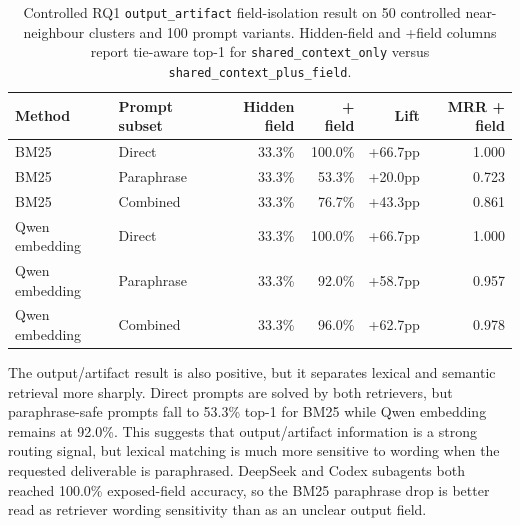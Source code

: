 \begin{table}[H]
\centering
\scriptsize
\setlength{\tabcolsep}{2pt}
\begin{tabular}{p{}p{}rrrr}
\toprule
Method & Prompt subset & Hidden field & + field & Lift & MRR + field \\
\midrule
BM25 & Direct & 33.3\% & 100.0\% & +66.7pp & 1.000 \\
BM25 & Paraphrase & 33.3\% & 53.3\% & +20.0pp & 0.723 \\
BM25 & Combined & 33.3\% & 76.7\% & +43.3pp & 0.861 \\
Qwen embedding & Direct & 33.3\% & 100.0\% & +66.7pp & 1.000 \\
Qwen embedding & Paraphrase & 33.3\% & 92.0\% & +58.7pp & 0.957 \\
Qwen embedding & Combined & 33.3\% & 96.0\% & +62.7pp & 0.978 \\
\bottomrule
\end{tabular}
\caption{Controlled RQ1 \texttt{output\_artifact} field-isolation result on 50 controlled near-neighbour clusters and 100 prompt variants. Hidden-field and +field columns report tie-aware top-1 for \texttt{shared\_context\_only} versus \texttt{shared\_context\_plus\_field}.}
\label{tab:rq1a-output-artifact-isolation}
\end{table}

The output/artifact result is also positive, but it separates lexical and semantic retrieval more sharply. Direct prompts are solved by both retrievers, but paraphrase-safe prompts fall to 53.3\% top-1 for BM25 while Qwen embedding remains at 92.0\%. This suggests that output/artifact information is a strong routing signal, but lexical matching is much more sensitive to wording when the requested deliverable is paraphrased. DeepSeek and Codex subagents both reached 100.0\% exposed-field accuracy, so the BM25 paraphrase drop is better read as retriever wording sensitivity than as an unclear output field.

